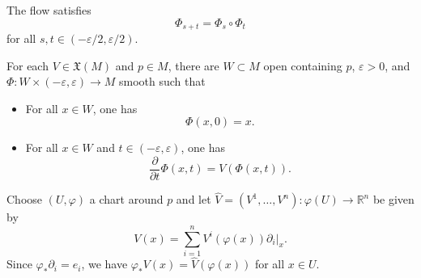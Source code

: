 \documentclass{ximera}
\begin{document}
    \begin{corollary}
        The flow satisfies 
        \[  \Phi_{s + t} = \Phi _s \circ \Phi _t          \]
        for all $s,t \in (-\varepsilon / 2 , \varepsilon / 2)$.
    \end{corollary}
    
    \begin{theorem}\label{thm:e-and-u-manifolds}
        For each $V \in \mathfrak{X} (M)$ and $p \in M$, there are $W \subset M$ open containing $p$, $\varepsilon > 0$, and $\Phi : W \times (- \varepsilon , \varepsilon ) \to M$ smooth such that
    \begin{itemize}
        \item For all $x \in W$, one has 
        \[      \Phi (x,0) = x  .      \]
        \item For all $x \in W $ and $t \in (- \varepsilon , \varepsilon )$, one has 
        \[     \frac{\partial}{\partial t} \Phi (x,t) = V(\Phi (x,t)) .       \]
    \end{itemize}
    \begin{solution}
        Choose $(U, \varphi)$ a chart around $p$ and let $\hat{V} = (V^1 , \ldots , V^n) : \varphi (U) \to \mathbb{R}^n $ be given by 
        \[     V (  x  )  =  \sum _{i = 1 }^n V^i (\varphi (x)) \partial _i \vert _x  .       \]
        Since $\varphi _{\ast} \partial _i  = e _i $, we have   $\varphi _{\ast} V(x) = \hat{V} (\varphi (x) )$ for all $x \in U$. 
        

\end{solution}
\end{theorem}
\end{document}
